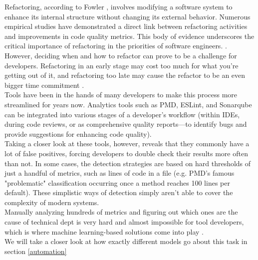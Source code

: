 Refactoring, according to Fowler \cite{fowler2018refactoring}, involves modifying a software system to enhance its internal structure without changing its external behavior. Numerous empirical studies have demonstrated a direct link between refactoring activities and improvements in code quality metrics. This body of evidence underscores the critical importance of refactoring in the priorities of software engineers. \cite{aniche2020effectiveness}.\\
However, deciding when and how to refactor can prove to be a challenge for developers. Refactoring in an early stage may cost too much for what you're getting out of it, and refactoring too late may cause the refactor to be an even bigger time commitment \cite{kruchten2012technical}.\\
Tools have been in the hands of many developers to make this process more streamlined for years now. Analytics tools such as PMD, ESLint, and Sonarqube can be integrated into various stages of a developer's workflow (within IDEs, during code reviews, or as comprehensive quality reports—to identify bugs and provide suggestions for enhancing code quality)\cite{aniche2020effectiveness}.\\
Taking a closer look at these tools, however, reveals that they commonly have a lot of false positives, forcing developers to double check their results more often than not. In some cases, the detection strategies are based on hard thresholds of just a handful of metrics, such as lines of code in a file (e.g. PMD's famous "problematic" classification occurring once a method reaches 100 lines per default)\cite{aniche2020effectiveness}. These simplistic ways of detection simply aren't able to cover the complexity of modern systems.\\
Manually analyzing hundreds of metrics and figuring out which ones are the cause of technical dept is very hard and almost impossible for tool developers, which is where machine learning-based solutions come into play \cite{kataoka2002refactoring}\cite{leitch2003maintainability}.\\
We will take a closer look at how exactly different models go about this task in section \ref{automation}
